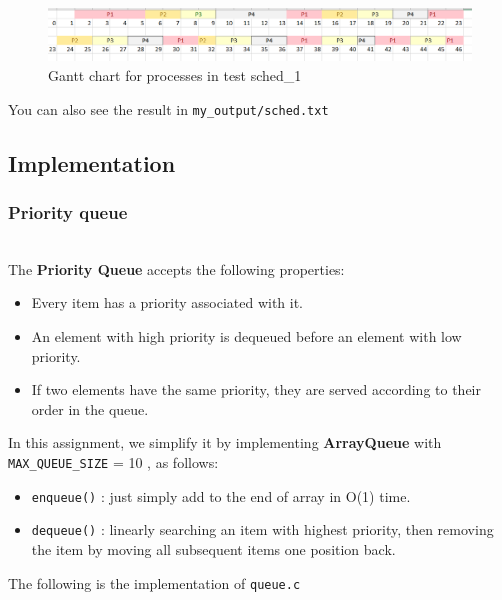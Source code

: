 \documentclass[a4paper]{article}
\begin{document}
	\begin{figure}[h]
	    \centering
	    \includegraphics[width=\textwidth]{TEST1.PNG}
	    \caption{Gantt chart for processes in test sched\_1}
	    \label{fig:my_label}
	\end{figure}
    You can also see the result in \texttt{my\_output/sched.txt} \\
    \newpage
	\subsection{Implementation}
	\subsubsection{Priority queue}
	\hfill\\
	The \textbf{Priority Queue} accepts the following properties:
	\begin{itemize}
	    \item Every item has a priority associated with it.
        \item An element with high priority is dequeued before an element  with low priority.
        \item If two elements have the same priority, they are served according to their order in the queue.
	\end{itemize}
	In this assignment, we simplify it by implementing \textbf{ArrayQueue}
	with \texttt{MAX\_QUEUE\_SIZE} = 10 , as follows:
	\begin{itemize}
	    \item \texttt{enqueue()} : just simply add to the end of array in O(1) time.
	    \item \texttt{dequeue()} : linearly searching an item with highest priority, then removing the item by moving all subsequent items one position back.
	\end{itemize}
	The following is the implementation of \texttt{queue.c} \\
\end{document}
